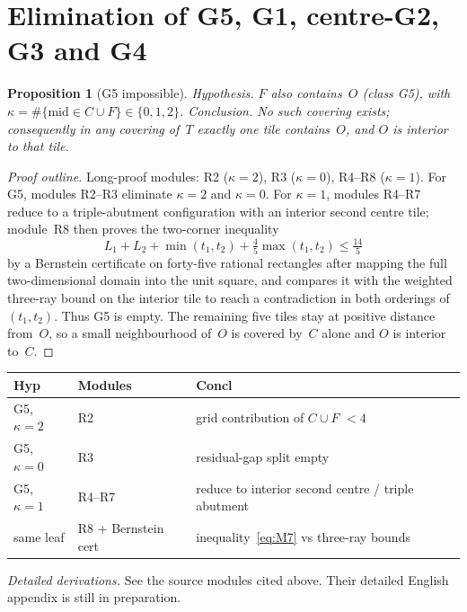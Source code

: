 \documentclass[11pt,reqno]{amsart}
\newtheorem{proposition}[theorem]{Proposition}
\theoremstyle{definition}
\begin{document}
\section{Elimination of G5, G1, centre-G2, G3 and G4}\label{sec:early}

\begin{proposition}[G5 impossible]\label{prop:M41}
\emph{Hypothesis.} $F$ also contains~$O$ (class G5), with
$\kappa=\#\{\mathrm{mid}\in C\cup F\}\in\{0,1,2\}$.
\emph{Conclusion.} No such covering exists; consequently in any covering of~$T$
exactly one tile contains~$O$, and $O$ is interior to that tile.
\end{proposition}

\begin{proof}[Proof outline]
Long-proof modules: R2 ($\kappa=2$), R3 ($\kappa=0$), R4--R8 ($\kappa=1$).
For G5, modules R2--R3 eliminate $\kappa=2$ and $\kappa=0$.  For $\kappa=1$, modules
R4--R7 reduce to a triple-abutment configuration with an interior second
centre tile; module~R8 then proves the two-corner inequality
\begin{equation}\label{eq:M7}
L_1+L_2+\min(t_1,t_2)+\tfrac45\max(t_1,t_2)\le\tfrac{14}{5}
\end{equation}
by a Bernstein certificate on forty-five rational rectangles after mapping the
full two-dimensional domain into the unit square, and compares it with the
weighted three-ray bound on the interior tile to reach a contradiction in both
orderings of $(t_1,t_2)$.  Thus G5 is empty.  The remaining five tiles stay at
positive distance from~$O$, so a small neighbourhood of~$O$ is covered by~$C$
alone and $O$ is interior to~$C$.
\end{proof}

\begin{center}
\small
\begin{tabular}{@{}llp{}@{}}
\toprule
Hyp & Modules & Concl \\
\midrule
G5, $\kappa=2$ & R2 & grid contribution of $C\cup F$ $<4$ \\
G5, $\kappa=0$ & R3 & residual-gap split empty \\
G5, $\kappa=1$ & R4--R7 & reduce to interior second centre / triple abutment \\
same leaf & R8 + Bernstein cert & inequality~\eqref{eq:M7} vs three-ray bounds \\
\bottomrule
\end{tabular}
\end{center}
\smallskip
\noindent\emph{Detailed derivations.} See the source modules cited above. Their detailed English appendix is still in preparation.
\end{document}
